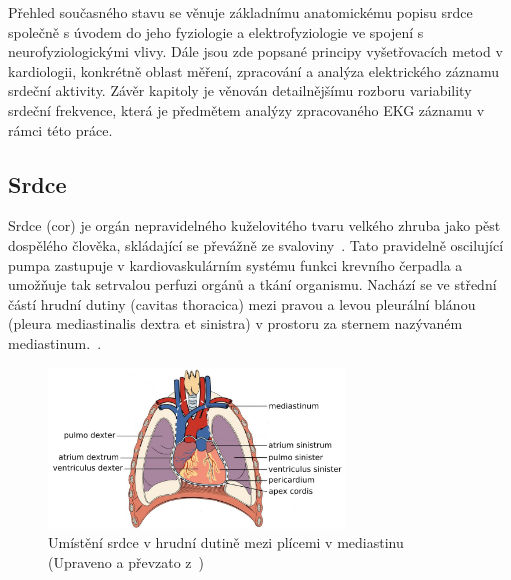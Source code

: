 Přehled současného stavu se věnuje základnímu anatomickému popisu srdce společně
s úvodem do jeho fyziologie a elektrofyziologie ve spojení s neurofyziologickými
vlivy. Dále jsou zde popsané principy vyšetřovacích metod v kardiologii,
konkrétně oblast měření, zpracování a analýza elektrického záznamu srdeční
aktivity. Závěr kapitoly je věnován detailnějšímu rozboru variability srdeční
frekvence, která je předmětem analýzy zpracovaného EKG záznamu v rámci
této práce.

\subsection{Srdce}
\label{section:heart}
Srdce (cor) je orgán nepravidelného kuželovitého tvaru velkého zhruba jako pěst
dospělého člověka, skládající se převážně ze svaloviny~\cite{Memorix2017}. Tato
pravidelně oscilující pumpa zastupuje v kardiovaskulárním systému funkci
krevního čerpadla a umožňuje tak setrvalou perfuzi orgánů a tkání organismu.
Nachází se ve střední částí hrudní dutiny (cavitas thoracica) mezi pravou a
levou pleurální blánou (pleura mediastinalis dextra et sinistra) v prostoru za
sternem nazývaném mediastinum.~\cite{Weinhaus2005}.

\begin{figure}[h]
	\begin{center}
		\includegraphics[width=0.7\textwidth]{../assets/anatomy/mediastinum}
		\caption{Umístění srdce v hrudní dutině mezi plícemi v mediastinu
			(Upraveno a převzato z~\cite{OpenStax})}
		\label{fig:mediastinum}
	\end{center}
\end{figure}

